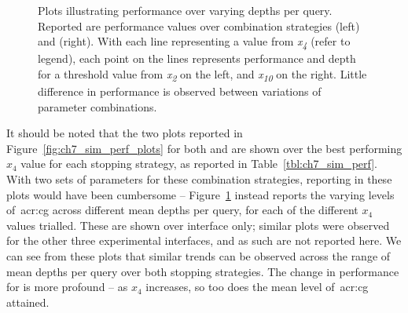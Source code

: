 \begin{figure}[t!]
    \centering
    \caption[\emph{What-if} performance over combination stopping strategies]{Plots illustrating performance over varying depths per query. Reported are performance values over combination strategies  (left) and  (right). With each line representing a value from \emph{x\textsubscript{4}} (refer to legend), each point on the lines represents performance and depth for a threshold value from \emph{x\textsubscript{2}} on the left, and \emph{x\textsubscript{10}} on the right. Little difference in performance is observed between variations of parameter combinations.}
    \label{fig:ch7_sim_perf_plots_combo}
\end{figure}

It should be noted that the two plots reported in Figure~\ref{fig:ch7_sim_perf_plots} for both  and  are shown over the best performing $x_4$ value for each stopping strategy, as reported in Table~\ref{tbl:ch7_sim_perf}. With two sets of parameters for these combination strategies, reporting in these plots would have been cumbersome -- Figure~\ref{fig:ch7_sim_perf_plots_combo} instead reports the varying levels of~\gls{acr:cg} across different mean depths per query, for each of the different $x_4$ values trialled. These are shown over interface  only; similar plots were observed for the other three experimental interfaces, and as such are not reported here. We can see from these plots that similar trends can be observed across the range of mean depths per query over both stopping strategies. The change in performance for  is more profound -- as $x_4$ increases, so too does the mean level of~\gls{acr:cg} attained.

